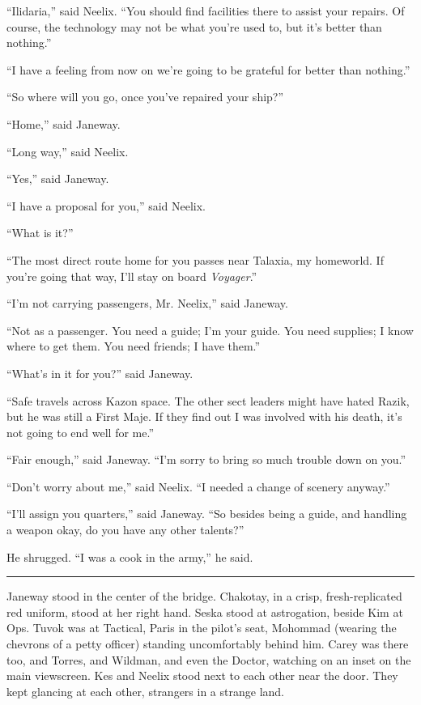 \documentclass[twoside,letterpaper,12pt]{memoir}
\begin{document}
``Ilidaria,” said Neelix. ``You should find facilities there to assist your repairs. Of course, the technology may not be what you’re used to, but it’s better than nothing.” 

``I have a feeling from now on we’re going to be grateful for better than nothing.” 

``So where will you go, once you’ve repaired your ship?” 

``Home,” said Janeway. 

``Long way,” said Neelix. 

``Yes,” said Janeway.

``I have a proposal for you,” said Neelix. 

``What is it?” 

``The most direct route home for you passes near Talaxia, my homeworld. If you’re going that way, I’ll stay on board \textit{Voyager}.” 

``I’m not carrying passengers, Mr. Neelix,” said Janeway. 

``Not as a passenger. You need a guide; I’m your guide. You need supplies; I know where to get them. You need friends; I have them.” 

``What’s in it for you?” said Janeway. 

``Safe travels across Kazon space. The other sect leaders might have hated Razik, but he was still a First Maje. If they find out I was involved with his death, it’s not going to end well for me.” 

``Fair enough,” said Janeway. ``I’m sorry to bring so much trouble down on you.” 

``Don’t worry about me,” said Neelix. ``I needed a change of scenery anyway.” 

``I’ll assign you quarters,” said Janeway. ``So besides being a guide, and handling a weapon okay, do you have any other talents?” 

He shrugged. ``I was a cook in the army,” he said. 

\begin{center}\rule{3cm}{0.4 pt}\end{center} 

Janeway stood in the center of the bridge. Chakotay, in a crisp, fresh-replicated red uniform, stood at her right hand. Seska stood at astrogation, beside Kim at Ops. Tuvok was at Tactical, Paris in the pilot’s seat, Mohommad (wearing the chevrons of a petty officer) standing uncomfortably behind him. Carey was there too, and Torres, and Wildman, and even the Doctor, watching on an inset on the main viewscreen. Kes and Neelix stood next to each other near the door. They kept glancing at each other, strangers in a strange land. 
\end{document}
